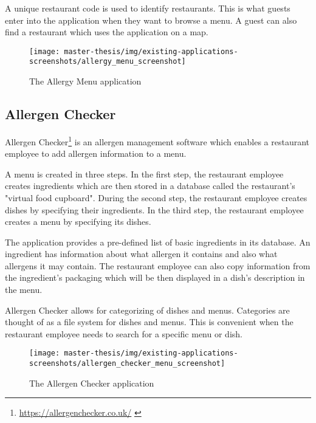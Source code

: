   A unique restaurant code is used to identify restaurants. 
  This is what guests enter into the application when they want to browse a menu.
  A guest can also find a restaurant which uses the application on a map.

  \newpage

  \begin{figure}[h]
    \centering
    \texttt{[image: master-thesis/img/existing-applications-screenshots/allergy\_menu\_screenshot]}
    \caption{The Allergy Menu application}
  \end{figure}

\subsection*{Allergen Checker}
  Allergen Checker\footnote{\url{https://allergenchecker.co.uk/}  \label{fnlabel}} is an allergen management software which enables a restaurant employee to add allergen information to a menu.
  
  A menu is created in three steps.
  In the first step, the restaurant employee creates ingredients which are then stored in a database called the restaurant's "virtual food cupboard".
  During the second step, the restaurant employee creates dishes by specifying their ingredients.
  In the third step, the restaurant employee creates a menu by specifying its dishes.
  
  The application provides a pre-defined list of basic ingredients in its database.
  An ingredient has information about what allergen it contains and also what allergens it may contain. 
  The restaurant employee can also copy information from the ingredient's packaging which will be then displayed in a dish's description in the menu.
  
  Allergen Checker allows for categorizing of dishes and menus. 
  Categories are thought of as a file system for dishes and menus.
  This is convenient when the restaurant employee needs to search for a specific menu or dish.

  \begin{figure}[h]
    \centering
    \texttt{[image: master-thesis/img/existing-applications-screenshots/allergen\_checker\_menu\_screenshot]}
    \caption{The Allergen Checker application}
  \end{figure}

